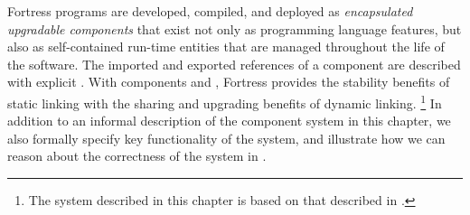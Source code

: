 

Fortress programs
are developed, compiled, and deployed as
\emph{encapsulated upgradable components}
that exist not only as programming language features, but also as
self-contained run-time entities that are managed
throughout the life of the software.
The imported and exported references of a component
are described with explicit \emph{\apisN}.
With components and \apisN, Fortress
provides the stability benefits of
static linking with the sharing and upgrading benefits of
dynamic linking.
\footnote{The system described in this chapter is based on that
described in \cite{allen-05-components}.}
In addition to an informal description of the component system in this
chapter, we also formally specify key functionality of the system,
and illustrate how we can reason about the correctness of the system
in .
